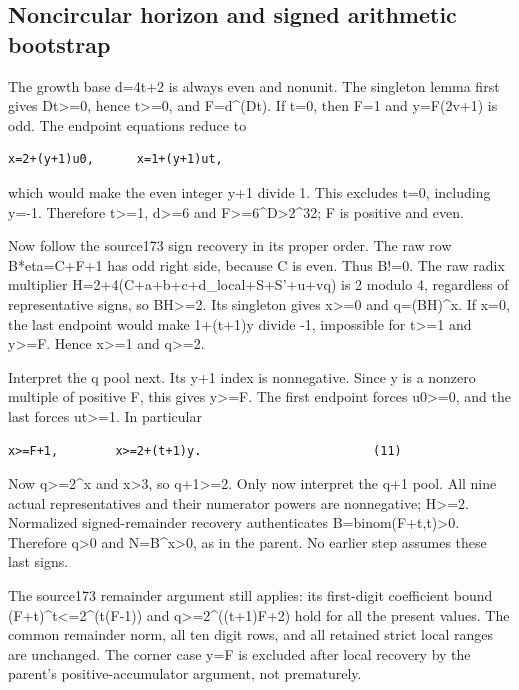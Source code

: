 \subsection{Noncircular horizon and signed arithmetic
bootstrap}\label{noncircular-horizon-and-signed-arithmetic-bootstrap}

The growth base d=4t+2 is always even and nonunit. The singleton lemma
first gives Dt\textgreater=0, hence t\textgreater=0, and F=d\^{}(Dt). If
t=0, then F=1 and y=F(2v+1) is odd. The endpoint equations reduce to

\begin{verbatim}
x=2+(y+1)u0,      x=1+(y+1)ut,
\end{verbatim}

which would make the even integer y+1 divide 1. This excludes t=0,
including y=-1. Therefore t\textgreater=1, d\textgreater=6 and
F\textgreater=6\^{}D\textgreater2\^{}32; F is positive and even.

Now follow the source173 sign recovery in its proper order. The raw row
B*eta=C+F+1 has odd right side, because C is even. Thus B!=0. The raw
radix multiplier H=2+4(C+a+b+c+d\_local+S+S'+u+vq) is 2 modulo 4,
regardless of representative signs, so
\textbar BH\textbar\textgreater=2. Its singleton gives x\textgreater=0
and q=(BH)\^{}x. If x=0, the last endpoint would make 1+(t+1)y divide
-1, impossible for t\textgreater=1 and \textbar y\textbar\textgreater=F.
Hence x\textgreater=1 and \textbar q\textbar\textgreater=2.

Interpret the q pool next. Its y+1 index is nonnegative. Since y is a
nonzero multiple of positive F, this gives y\textgreater=F. The first
endpoint forces u0\textgreater=0, and the last forces ut\textgreater=1.
In particular

\begin{verbatim}
x>=F+1,        x>=2+(t+1)y.                        (11)
\end{verbatim}

Now \textbar q\textbar\textgreater=2\^{}x and x\textgreater3, so
\textbar q+1\textbar\textgreater=2. Only now interpret the q+1 pool. All
nine actual representatives and their numerator powers are nonnegative;
H\textgreater=2. Normalized signed-remainder recovery authenticates
B=binom(F+t,t)\textgreater0. Therefore q\textgreater0 and
N=B\^{}x\textgreater0, as in the parent. No earlier step assumes these
last signs.

The source173 remainder argument still applies: its first-digit
coefficient bound (F+t)\^{}t\textless=2\^{}(t(F-1)) and
\textbar q\textbar\textgreater=2\^{}((t+1)F+2) hold for all the present
values. The common remainder norm, all ten digit rows, and all retained
strict local ranges are unchanged. The corner case y=F is excluded after
local recovery by the parent's positive-accumulator argument, not
prematurely.

